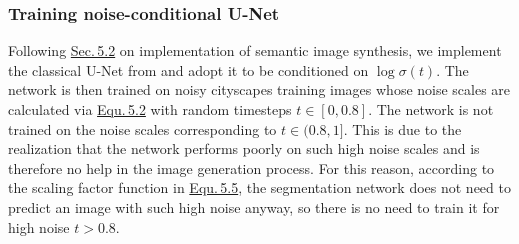 \subsubsection{Training noise-conditional U-Net}
Following \hyperref[sec:5.2]{Sec.\,5.2} on implementation of semantic image synthesis, we implement the classical U-Net from \cite{unet} and adopt it to be conditioned on $\log\sigma(t)$. The network is then trained on noisy cityscapes training images whose noise scales are calculated via \hyperref[equ:5.2]{Equ.\,5.2} with random timesteps $t\in[0,0.8]$. The network is not trained on the noise scales corresponding to $t\in(0.8,1]$. This is due to the realization that the network performs poorly on such high noise scales and is therefore no help in the image generation process. For this reason, according to the scaling factor function in \hyperref[equ:5.5]{Equ.\,5.5}, the segmentation network does not need to predict an image with such high noise anyway, so there is no need to train it for high noise $t>0.8$.

